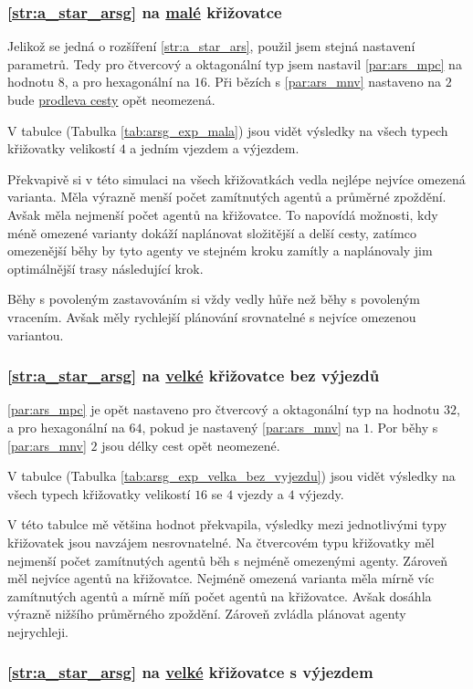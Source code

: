 \subsubsection{\ref{str:a_star_arsg} na \hyperref[par:data_mala]{malé} křižovatce}
\label{subsubsec:exp_arsg_mala_krizovatka}

Jelikož se jedná o rozšíření \ref{str:a_star_ars}, použil jsem stejná nastavení parametrů.
Tedy pro čtvercový a oktagonální typ jsem nastavil \ref{par:ars_mpc} na hodnotu $8$, a pro hexagonální na $16$.
Při bězích s \ref{par:ars_mnv} nastaveno na $2$ bude \hyperref[par:ars_mpc]{prodleva cesty} opět neomezená.


V tabulce (Tabulka \ref{tab:arsg_exp_mala}) jsou vidět výsledky na všech typech křižovatky
velikostí $4$ a jedním vjezdem a výjezdem.

Překvapivě si v této simulaci na všech křižovatkách vedla nejlépe nejvíce omezená varianta.
Měla výrazně menší počet zamítnutých agentů a průměrné zpoždění.
Avšak měla nejmenší počet agentů na křižovatce.
To napovídá možnosti, kdy méně omezené varianty dokáží naplánovat složitější a delší cesty,
zatímco omezenější běhy by tyto agenty ve stejném kroku zamítly a naplánovaly jim optimálnější trasy následující krok.

Běhy s povoleným zastavováním si vždy vedly hůře než běhy s povoleným vracením.
Avšak měly rychlejší plánování srovnatelné s nejvíce omezenou variantou.

\subsubsection{\ref{str:a_star_arsg} na \hyperref[par:data_velka]{velké} křižovatce bez výjezdů}
\label{subsubsec:exp_arsg_velka_krizovatka_bez_vyjezdu}

\ref{par:ars_mpc} je opět nastaveno pro čtvercový a oktagonální typ na hodnotu $32$,
a pro hexagonální na $64$, pokud je nastavený \ref{par:ars_mnv} na $1$.
Por běhy s \ref{par:ars_mnv} $2$ jsou délky cest opět neomezené.



V tabulce (Tabulka \ref{tab:arsg_exp_velka_bez_vyjezdu}) jsou vidět výsledky na všech typech křižovatky
velikostí $16$ se $4$ vjezdy a $4$ výjezdy.

V této tabulce mě většina hodnot překvapila, výsledky mezi jednotlivými typy křižovatek jsou navzájem nesrovnatelné.
Na čtvercovém typu křižovatky měl nejmenší počet zamítnutých agentů běh s nejméně omezenými agenty.
Zároveň měl nejvíce agentů na křižovatce.
Nejméně omezená varianta měla mírně víc zamítnutých agentů a mírně míň počet agentů na křižovatce.
Avšak dosáhla výrazně nižšího průměrného zpoždění.
Zároveň zvládla plánovat agenty nejrychleji.



\subsubsection{\ref{str:a_star_arsg} na \hyperref[par:data_velka]{velké} křižovatce s výjezdem}
\label{subsubsec:exp_arsg_velka_krizovatka_s_vyjezdem}
